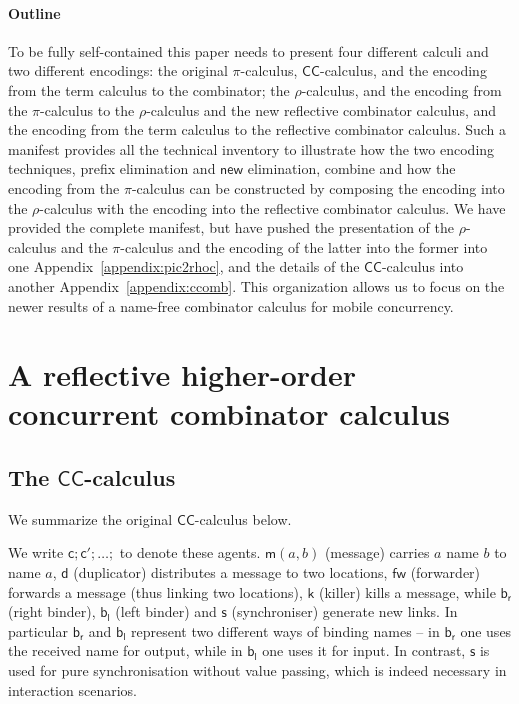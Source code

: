 \documentclass[submission,copyright,creativecommons]{eptcs}
\newcommand{\new}{\mathsf{new}}
\newcommand{\pic}{$\pi$-calculus}
\newcommand{\ccomb}{$\mathsf{CC}$-calculus}
\newcommand{\bc}{\mathbin{\mathbf{::=}}}
\newcommand{\bm}{\mathbin{\mathbf\mid}}
\newcommand{\rhoc}{$\rho$-calculus}
\theoremstyle{definition}
\theoremstyle{remark}
\theoremstyle{remark}
\begin{document}
\paragraph*{Outline}
To be fully self-contained this paper needs to present four different
calculi and two different encodings: the original {\pic}, {\ccomb},
and the encoding from the term calculus to the combinator; the
{\rhoc}, and the encoding from the {\pic} to the {\rhoc} and the new
reflective combinator calculus, and the encoding from the term
calculus to the reflective combinator calculus. Such a manifest
provides all the technical inventory to illustrate how the two
encoding techniques, prefix elimination and $\new$ elimination,
combine and how the encoding from the {\pic} can be constructed by
composing the encoding into the {\rhoc} with the encoding into the
reflective combinator calculus. We have provided the complete
manifest, but have pushed the presentation of the {\rhoc} and the
{\pic{}} and the encoding of the latter into the former into one
Appendix~\ref{appendix:pic2rhoc}, and the details of the {\ccomb} into
another Appendix~\ref{appendix:ccomb}. This organization allows us to focus on
the newer results of a name-free combinator calculus for mobile
concurrency.


\section{A reflective higher-order concurrent combinator calculus}

\subsection{The {\ccomb}}

We summarize the original {\ccomb} \cite{DBLP:journals/tcs/Yoshida02} below.


We write $\mathsf{c};\mathsf{c'};\ldots;$ to denote these
agents. $\mathsf{m}(a,b)$ (message) carries $a$ name $b$ to name $a$,
$\mathsf{d}$ (duplicator) distributes a message to two locations,
$\mathsf{fw}$ (forwarder) forwards a message (thus linking two
locations), $\mathsf{k}$ (killer) kills a message, while
$\mathsf{b}_{\mathsf{r}}$ (right binder), $\mathsf{b}_{\mathsf{l}}$
(left binder) and $\mathsf{s}$ (synchroniser) generate new links. In
particular $\mathsf{b}_{\mathsf{r}}$ and $\mathsf{b}_{\mathsf{l}}$
represent two different ways of binding names – in
$\mathsf{b}_{\mathsf{r}}$ one uses the received name for output, while
in $\mathsf{b}_{\mathsf{l}}$ one uses it for input. In contrast,
$\mathsf{s}$ is used for pure synchronisation without value passing,
which is indeed necessary in interaction scenarios.
\end{document}
